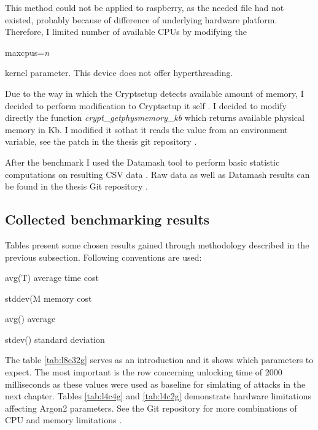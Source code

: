 \documentclass[nolof]{fithesis3}
\begin{document}
This method could not be applied to raspberry, as the needed file had not existed, probably because of difference of underlying hardware platform. Therefore, I limited number of available CPUs by modifying the 
\begin{tt}
maxcpus=\emph{n}
\end{tt}
 kernel parameter. This device does not offer hyperthreading.

Due to the way in which the Cryptsetup detects available amount of memory, I decided to perform modification to Cryptsetup it self \parencite{cryptsetuputils}. I decided to modify directly the function \emph{crypt\_getphysmemory\_kb} which returns available physical memory in Kb. I modified it sothat it reads the value from an environment variable, see the patch in the thesis git repository \parencite{thesisrepo}.

After the benchmark I used the Datamash tool to perform basic statistic computations on resulting CSV data \parencite{datamash}. Raw data as well as Datamash results can be found in the thesis Git repository \parencite{thesisrepo}.

\FloatBarrier

\subsection{Collected benchmarking results}
Tables present some chosen results gained through methodology described in the previous subsection. Following conventions are used:

\begin{description}
\item{avg(T)} average time cost

\item{stddev(M} memory cost

\item{avg()} average

\item{stdev()} standard deviation
\end{description}

The table \ref{tab:l8c32g} serves as an introduction and it shows which parameters to expect. The most important is the row concerning unlocking time of 2000 milliseconds as these values were used as baseline for simlating of attacks in the next chapter. Tables \ref{tab:l4c4g} and \ref{tab:l4c2g} demonstrate hardware limitations affecting Argon2 parameters. See the Git repository for more combinations of CPU and memory limitations \parencite{thesisrepo}.
\end{document}
